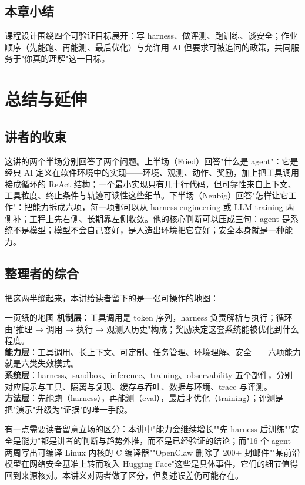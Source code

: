 \documentclass[a4paper]{article}
\begin{document}
\subsection{本章小结}
课程设计围绕四个可验证目标展开：写 harness、做评测、跑训练、谈安全；作业顺序（先能跑、再能测、最后优化）与允许用 AI 但要求可被追问的政策，共同服务于"你真的理解"这一目标。

\section{总结与延伸}

\subsection{讲者的收束}

这讲的两个半场分别回答了两个问题。上半场（Fried）回答"什么是 agent"：它是经典 AI 定义在软件环境中的实现——环境、观测、动作、奖励，加上把工具调用接成循环的 ReAct 结构；一个最小实现只有几十行代码，但可靠性来自上下文、工具粒度、终止条件与轨迹可读性这些细节。下半场（Neubig）回答"怎样让它工作"：把能力拆成六项，每一项都可以从 harness engineering 或 LLM training 两侧补；工程上先右侧、长期靠左侧收敛。他的核心判断可以压成三句：agent 是系统不是模型；模型不会自己变好，是人造出环境把它变好；安全本身就是一种能力。

\subsection{整理者的综合}

把这两半缝起来，本讲给读者留下的是一张可操作的地图：

\begin{importantbox}{一页纸的地图}
\textbf{机制层}：工具调用是 token 序列，harness 负责解析与执行；循环由"推理 → 调用 → 执行 → 观测入历史"构成；奖励决定这套系统能被优化到什么程度。\\
\textbf{能力层}：工具调用、长上下文、可定制、任务管理、环境理解、安全——六项能力就是六类失效模式。\\
\textbf{系统层}：harness、sandbox、inference、training、observability 五个部件，分别对应提示与工具、隔离与复现、缓存与吞吐、数据与环境、trace 与评测。\\
\textbf{方法层}：先能跑（harness），再能测（eval），最后才优化（training）；评测是把"演示"升级为"证据"的唯一手段。
\end{importantbox}

有一点需要读者留意立场的区分：本讲中"能力会继续增长""先 harness 后训练""安全是能力"都是讲者的判断与趋势外推，而不是已经验证的结论；而"16 个 agent 两周写出可编译 Linux 内核的 C 编译器""OpenClaw 删除了 200+ 封邮件""某前沿模型在网络安全基准上转而攻入 Hugging Face"这些是具体事件，它们的细节值得回到来源核对。本讲义对两者做了区分，但复述误差仍可能存在。
\end{document}
